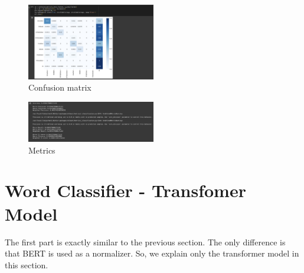 \documentclass{solutionclass} %
\begin{document}
\begin{figure}[h!]
    \caption{Confusion matrix}
    \centering
    \includegraphics[width=0.5\textwidth]{img/1/11.png}
\end{figure}

\begin{figure}[h!]
    \caption{Metrics}
    \centering
    \includegraphics[width=0.5\textwidth]{img/1/12.png}
\end{figure}


\section{Word Classifier -  Transfomer Model}

The first part is exactly similar to the previous section. The only difference is that BERT is used as a normalizer. So, we explain only the transformer model in this section.
\end{document}
